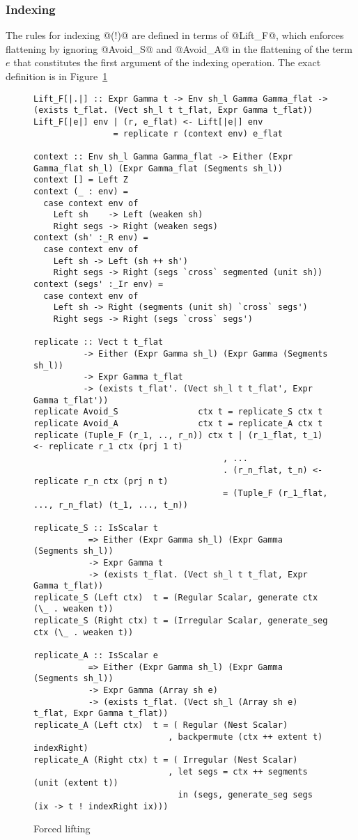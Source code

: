 \subsubsection{Indexing}
The rules for indexing @(!)@ are defined in terms of @Lift_F@, which enforces flattening by ignoring @Avoid_S@ and @Avoid_A@ in the flattening of the term $e$ that constitutes the first argument of the indexing operation. The exact definition is in Figure~\ref{fig:forced-lifting}

\begin{figure}
\begin{lstlisting}[style=ndp]
Lift_F[|.|] :: Expr Gamma t -> Env sh_l Gamma Gamma_flat -> (exists t_flat. (Vect sh_l t t_flat, Expr Gamma t_flat))
Lift_F[|e|] env | (r, e_flat) <- Lift[|e|] env
                = replicate r (context env) e_flat

context :: Env sh_l Gamma Gamma_flat -> Either (Expr Gamma_flat sh_l) (Expr Gamma_flat (Segments sh_l))
context [] = Left Z
context (_ : env) =
  case context env of
    Left sh    -> Left (weaken sh)
    Right segs -> Right (weaken segs)
context (sh' :_R env) =
  case context env of
    Left sh -> Left (sh ++ sh')
    Right segs -> Right (segs `cross` segmented (unit sh))
context (segs' :_Ir env) =
  case context env of
    Left sh -> Right (segments (unit sh) `cross` segs')
    Right segs -> Right (segs `cross` segs')

replicate :: Vect t t_flat
          -> Either (Expr Gamma sh_l) (Expr Gamma (Segments sh_l))
          -> Expr Gamma t_flat
          -> (exists t_flat'. (Vect sh_l t t_flat', Expr Gamma t_flat'))
replicate Avoid_S                ctx t = replicate_S ctx t
replicate Avoid_A                ctx t = replicate_A ctx t
replicate (Tuple_F (r_1, .., r_n)) ctx t | (r_1_flat, t_1) <- replicate r_1 ctx (prj 1 t)
                                      , ...
                                      . (r_n_flat, t_n) <- replicate r_n ctx (prj n t)
                                      = (Tuple_F (r_1_flat, ..., r_n_flat) (t_1, ..., t_n))

replicate_S :: IsScalar t
           => Either (Expr Gamma sh_l) (Expr Gamma (Segments sh_l))
           -> Expr Gamma t
           -> (exists t_flat. (Vect sh_l t t_flat, Expr Gamma t_flat))
replicate_S (Left ctx)  t = (Regular Scalar, generate ctx (\_ . weaken t))
replicate_S (Right ctx) t = (Irregular Scalar, generate_seg ctx (\_ . weaken t))

replicate_A :: IsScalar e
           => Either (Expr Gamma sh_l) (Expr Gamma (Segments sh_l))
           -> Expr Gamma (Array sh e)
           -> (exists t_flat. (Vect sh_l (Array sh e) t_flat, Expr Gamma t_flat))
replicate_A (Left ctx)  t = ( Regular (Nest Scalar)
                           , backpermute (ctx ++ extent t) indexRight)
replicate_A (Right ctx) t = ( Irregular (Nest Scalar)
                           , let segs = ctx ++ segments (unit (extent t))
                             in (segs, generate_seg segs (ix -> t ! indexRight ix)))
\end{lstlisting}
\caption{Forced lifting}
\label{fig:forced-lifting}
\end{figure}

